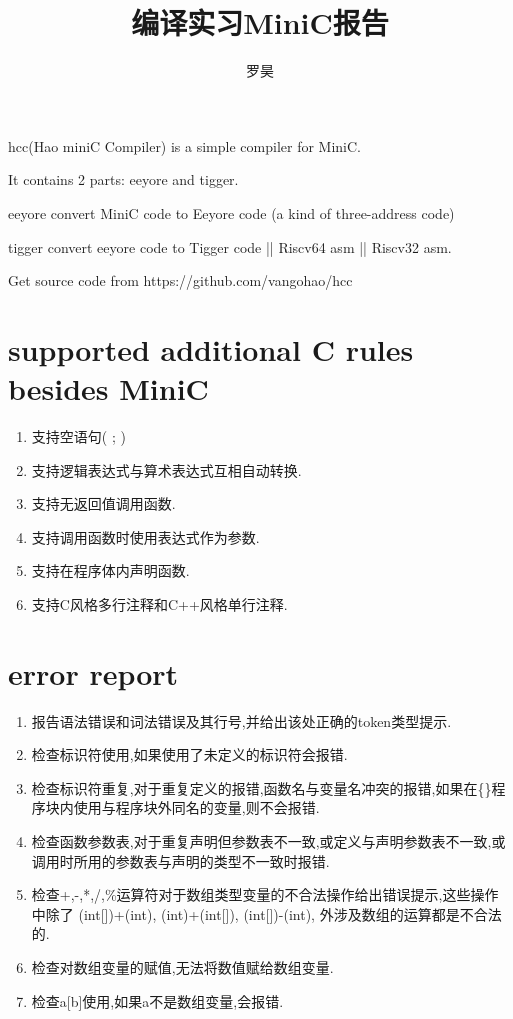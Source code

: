 \documentclass[UTF8]{article}
\begin{document}
\title{编译实习MiniC报告}
\author{罗昊}
\maketitle
hcc(Hao miniC Compiler) is a simple compiler for MiniC.

It contains 2 parts: eeyore and tigger. 

eeyore convert MiniC code to Eeyore code (a kind of three-address code)

tigger convert eeyore code to Tigger code || Riscv64 asm || Riscv32 asm.

Get source code from https://github.com/vangohao/hcc

\section{supported additional C rules besides MiniC}
\begin{enumerate}
\item 支持空语句( ; )
\item 支持逻辑表达式与算术表达式互相自动转换.
\item 支持无返回值调用函数.
\item 支持调用函数时使用表达式作为参数.
\item 支持在程序体内声明函数.
\item 支持C风格多行注释和C++风格单行注释.
\end{enumerate}
\section{error report}
\begin{enumerate}
\item 报告语法错误和词法错误及其行号,并给出该处正确的token类型提示.
\item 检查标识符使用,如果使用了未定义的标识符会报错.
\item 检查标识符重复,对于重复定义的报错,函数名与变量名冲突的报错,如果在\{\}程序块内使用与程序块外同名的变量,则不会报错.
\item 检查函数参数表,对于重复声明但参数表不一致,或定义与声明参数表不一致,或调用时所用的参数表与声明的类型不一致时报错.
\item 检查+,-,*,/,\%运算符对于数组类型变量的不合法操作给出错误提示,这些操作中除了 (int[])+(int), (int)+(int[]), (int[])-(int), 外涉及数组的运算都是不合法 的.
\item 检查对数组变量的赋值,无法将数值赋给数组变量.
\item 检查a[b]使用,如果a不是数组变量,会报错.
\end{enumerate}
\end{document}

